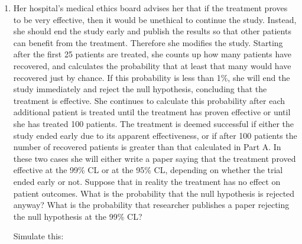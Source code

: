 \begin{enumerate}[label=\textbf{\Alph*}.]
    \item Her hospital's medical ethics board advises her that if the treatment proves to be very effective, then it would be unethical to continue the study. Instead, she should end the study early and publish the results so that other patients can benefit from the treatment. Therefore she modifies the study. Starting after the first 25 patients are treated, she counts up how many patients have recovered, and calculates the probability that at least that many would have recovered just by chance. If this probability is less than 1\%, she will end the study immediately and reject the null hypothesis, concluding that the treatment is effective. She continues to calculate this probability after each additional patient is treated until the treatment has proven effective or until she has treated 100 patients. The treatment is deemed successful if either the study ended early due to its apparent effectiveness, or if after 100 patients the number of recovered patients is greater than that calculated in Part A. In these two cases she will either write a paper saying that the treatment proved effective at the 99\% CL or at the 95\% CL, depending on whether the trial ended early or not. Suppose that in reality the treatment has no effect on patient outcomes. What is the probability that the null hypothesis is rejected anyway? What is the probability that researcher publishes a paper rejecting the null hypothesis at the 99\% CL?
    
    Simulate this: 




\end{enumerate}
